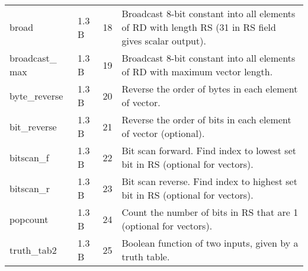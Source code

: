 \documentclass[forwardcom.tex]{subfiles}
\begin{document}
\begin{longtable} {|p{20mm}|p{10mm}|p{8mm}|p{75mm}|}
broad         & 1.3 B & 18 & Broadcast 8-bit constant into all elements of RD with length RS (31 in RS field gives scalar output). \\

broadcast\_ max & 1.3 B & 19 & Broadcast 8-bit constant into all elements of RD with maximum vector length. \\

byte\_reverse & 1.3 B & 20 & Reverse the order of bytes in each element of vector. \\
bit\_reverse  & 1.3 B & 21 & Reverse the order of bits in each element of vector (optional). \\

bitscan\_f    & 1.3 B & 22 & Bit scan forward. Find index to lowest set bit in RS (optional for vectors). \\
bitscan\_r    & 1.3 B & 23 & Bit scan reverse. Find index to highest set bit in RS (optional for vectors). \\
popcount      & 1.3 B & 24 & Count the number of bits in RS that are 1 (optional for vectors). \\
truth\_tab2   & 1.3 B & 25 & Boolean function of two inputs, given by a truth table. \\


\end{longtable}
\end{document}
